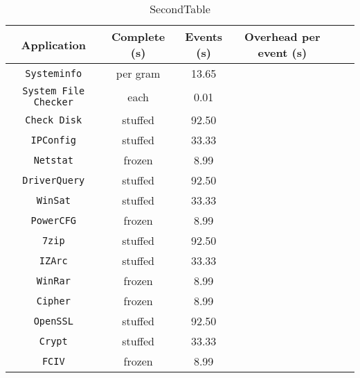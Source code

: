 \begin{table}
\centering
\begin{tabular}{cccccc}
\hline
\hline
\cline{1-2}
   \textbf{Application} & \textbf{Complete (s)} & \textbf{Events (s)} & \textbf{Overhead per event (s)} \\
\hline
\texttt{Systeminfo}      & per gram    & 13.65      \\
\texttt{System File Checker}          & each        & 0.01       \\
\texttt{Check Disk}       & stuffed     & 92.50      \\
\texttt{IPConfig}       & stuffed     & 33.33      \\
\texttt{Netstat} & frozen      & 8.99       \\
\texttt{DriverQuery}       & stuffed     & 92.50      \\
\texttt{WinSat}       & stuffed     & 33.33      \\
\texttt{PowerCFG} & frozen      & 8.99       \\
\texttt{7zip}       & stuffed     & 92.50      \\
\texttt{IZArc}      & stuffed     & 33.33      \\
\texttt{WinRar} & frozen      & 8.99       \\
\texttt{Cipher} & frozen      & 8.99       \\
\texttt{OpenSSL}       & stuffed     & 92.50      \\
\texttt{Crypt}      & stuffed     & 33.33      \\
\texttt{FCIV} & frozen      & 8.99       \\
\hline
\end{tabular}
\caption{SecondTable}
\end{table}

